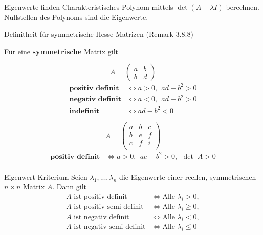 \begin{Rezept}{Eigenwerte finden}{}
	Charakteristisches Polynom mittels $\det (A-\lambda I)$ berechnen. Nullstellen des Polynoms sind die Eigenwerte.
\end{Rezept}

\begin{Satz}{Definitheit für symmetrische Hesse-Matrizen (Remark 3.8.8)}{}
\begin{center}Für eine \textbf{symmetrische} Matrix gilt\end{center}
\begin{multicols}{2}
\[ A = \begin{pmatrix}
         a & b\\
         b & d
       \end{pmatrix} \]
\begin{align*}
\textbf{positiv definit} & \Longleftrightarrow a > 0, ~~ ad-b^2>0\\
\textbf{negativ definit} & \Longleftrightarrow a < 0, ~~ ad-b^2>0\\
\textbf{indefinit} & \Longleftrightarrow ad-b^2 < 0
\end{align*}


\[ A = \begin{pmatrix}
         a & b & c\\
         b & e & f\\
         c & f & i\\
       \end{pmatrix} \]
\begin{align*}
\textbf{positiv definit} & \Longleftrightarrow a > 0, ~~ ae-b^2>0, ~~ \det \; A > 0\\
\end{align*}


\end{multicols}


\end{Satz}

\begin{Satz}{Eigenwert-Kriterium}{}
	Seien $\lambda_1, ..., \lambda_n$ die Eigenwerte einer reellen, symmetrischen $n \times n$ Matrix $A$. Dann gilt
	\begin{align*}
		A \text{ ist positiv definit} &\iff \text{Alle }\lambda_i > 0,\\
		A \text{ ist positiv semi-definit} &\iff \text{Alle }\lambda_i \geq 0,\\
		A \text{ ist negativ definit} &\iff \text{Alle }\lambda_i < 0,\\
		A \text{ ist negativ semi-definit} &\iff \text{Alle }\lambda_i \leq 0
	\end{align*}
\end{Satz}

